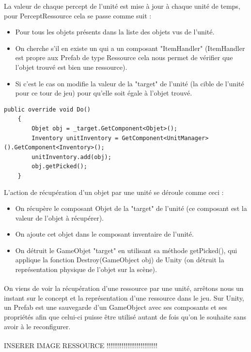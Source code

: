 \documentclass{report}
\begin{document}
La valeur de chaque percept de l'unité est mise à jour à chaque unité de temps, pour PerceptRessource cela se passe comme suit :
\begin{itemize}
\item Pour tous les objets présents dans la liste des objets vus de l'unité.
\item On cherche s'il en existe un qui a un composant "ItemHandler" (ItemHandler est propre aux Prefab de type Ressource cela nous permet de vérifier que l'objet trouvé est bien une ressource).
\item Si c'est le cas on modifie la valeur de la "target" de l'unité (la cible de l'unité pour ce tour de jeu) pour qu'elle soit égale à l'objet trouvé.
\end{itemize}
\begin{lstlisting}[language={[Sharp]C},label={lst:unitScript}, caption=  Extrait du code du script ActionPick.cs première version.]
    public override void Do()
    {
        Objet obj = _target.GetComponent<Objet>();
        Inventory unitInventory = GetComponent<UnitManager>().GetComponent<Inventory>();
        unitInventory.add(obj);
        obj.getPicked();
    }
\end{lstlisting}
L'action de récupération d'un objet par une unité se déroule comme ceci :
\begin{itemize}
\item On récupère le composant Objet de la "target" de l'unité (ce composant est la valeur de l'objet à récupérer).
\item On ajoute cet objet dans le composant inventaire de l'unité.
\item On détruit le GameObjet "target" en utilisant sa méthode getPicked(), qui applique la fonction Destroy(GameObject obj) de Unity (on détruit la représentation physique de l'objet sur la scène).
\end{itemize}
\paragraph{}On viens de voir la récupération d'une ressource par une unité, arrêtons nous un instant sur le concept et la représentation d'une ressource dans le jeu. Sur Unity, un Prefab est une sauvegarde d'un GameObject avec ses composants et ses propriétés afin que celui-ci puisse être utilisé autant de fois qu'on le souhaite sans avoir à le reconfigurer.
\paragraph{}
INSERER IMAGE RESSOURCE !!!!!!!!!!!!!!!!!!!!!!!!!!!
\end{document}
